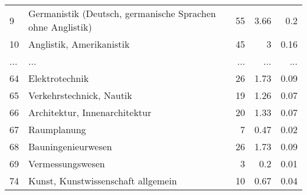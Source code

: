 \begin{longtable}{lXrrr}
        9 & \multicolumn{1}{X}{Germanistik (Deutsch, germanische Sprachen ohne Anglistik)} & %
          \num{55} &
          \num[round-mode=places,round-precision=2]{3.66} &
          \num[round-mode=places,round-precision=2]{0.2} \\
        10 & \multicolumn{1}{X}{Anglistik, Amerikanistik} & %
          \num{45} &
          \num[round-mode=places,round-precision=2]{3} &
          \num[round-mode=places,round-precision=2]{0.16} \\
       ... & ... & ... & ... & ... \\
        64 & \multicolumn{1}{X}{Elektrotechnik} & %
          \num{26} &
          \num[round-mode=places,round-precision=2]{1.73} &
          \num[round-mode=places,round-precision=2]{0.09} \\

        65 & \multicolumn{1}{X}{Verkehrstechnick, Nautik} & %
          \num{19} &
          \num[round-mode=places,round-precision=2]{1.26} &
          \num[round-mode=places,round-precision=2]{0.07} \\

        66 & \multicolumn{1}{X}{Architektur, Innenarchitektur} & %
          \num{20} &
          \num[round-mode=places,round-precision=2]{1.33} &
          \num[round-mode=places,round-precision=2]{0.07} \\

        67 & \multicolumn{1}{X}{Raumplanung} & %
          \num{7} &
          \num[round-mode=places,round-precision=2]{0.47} &
          \num[round-mode=places,round-precision=2]{0.02} \\

        68 & \multicolumn{1}{X}{Bauningenieurwesen} & %
          \num{26} &
          \num[round-mode=places,round-precision=2]{1.73} &
          \num[round-mode=places,round-precision=2]{0.09} \\

        69 & \multicolumn{1}{X}{Vermessungswesen} & %
          \num{3} &
          \num[round-mode=places,round-precision=2]{0.2} &
          \num[round-mode=places,round-precision=2]{0.01} \\

        74 & \multicolumn{1}{X}{Kunst, Kunstwissenschaft allgemein} & %
          \num{10} &
          \num[round-mode=places,round-precision=2]{0.67} &
          \num[round-mode=places,round-precision=2]{0.04} \\


\end{longtable}
